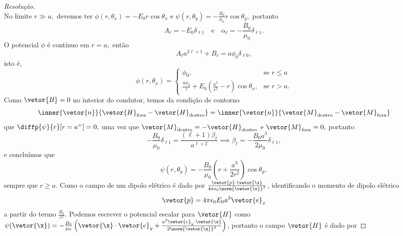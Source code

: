 \begin{proof}[Resolução]
\begin{equation*}
   \end{equation*}
   No limite \(r \gg a,\) devemos ter \(\phi(r, \theta_x) = -E_0r\cos\theta_x\) e \(\psi(r,\theta_y) = - \frac{B_0}{\mu_0} r\cos\theta_y,\) portanto 
   \begin{equation*}
      A_\ell = -E_0\delta_{\ell 1}
      \quad\text{e}\quad
      \alpha_\ell = - \frac{B_0}{\mu_0} \delta_{\ell 1}.
   \end{equation*}
   O potencial \(\phi\) é contínuo em \(r = a,\) então
   \begin{equation*}
      A_\ell a^{2\ell + 1} + B_\ell = a\phi_0 \delta_{\ell 0},
   \end{equation*}
   isto é,
   \begin{equation*}
      \phi(r,\theta_x) = \begin{cases}
         \phi_0,&\text{se }r \leq a\\
         \frac{a\phi_0}{r} + E_0\left(\frac{a^3}{r^2} - r\right)\cos\theta_x,&\text{se }r > a.
      \end{cases}
   \end{equation*}
   Como \(\vetor{B} = 0\) no interior do condutor, temos da condição de contorno 
   \begin{equation*}
      \inner{\vetor{n}}{\vetor{H}_\mathrm{fora} - \vetor{H}_\mathrm{dentro}} = \inner{\vetor{n}}{\vetor{M}_\mathrm{dentro} - \vetor{M}_\mathrm{fora}}
   \end{equation*}
   que \(\diffp{\psi}{r}[r = a^+] = 0,\) uma vez que \(\vetor{M}_\mathrm{dentro} = - \vetor{H}_\mathrm{dentro}\) e \(\vetor{M}_\mathrm{fora} = 0,\) portanto
   \begin{equation*}
      -\frac{B_0}{\mu_0} \delta_{\ell 1} = \frac{(\ell + 1) \beta_\ell}{a^{\ell + 2}} \implies \beta_\ell = -\frac{B_0a^3}{2\mu_0} \delta_{\ell 1},
   \end{equation*}
   e concluímos que
   \begin{equation*}
      \psi(r,\theta_y) = -\frac{B_0}{\mu_0} \left(r + \frac{a^3}{2r^2}\right) \cos\theta_y,
   \end{equation*}
   sempre que \(r \geq a.\)
   Como o campo de um dipolo elétrico é dado por \(\frac{\vetor{p} \cdot \vetor{\x}}{4\pi \epsilon_0 \norm{\vetor{\x}}^3}\), identificando o momento de dipolo elétrico
   \begin{equation*}
      \vetor{p} = 4\pi \epsilon_0 E_0 a^3 \vetor{e}_x
   \end{equation*}
   a partir do termo \(\frac{B_1}{r^2}.\) Podemos escrever o potencial escalar para \(\vetor{H}\) como \(\psi(\vetor{\x}) = -\frac{B_0}{\mu_0}\left(\vetor{\x}\cdot\vetor{e}_y + \frac{a^3 \vetor{e}_y \cdot \vetor{\x}}{2\norm{\vetor{\x}}^3}\right)\), portanto o campo \(\vetor{H}\) é dado por

\end{proof}
